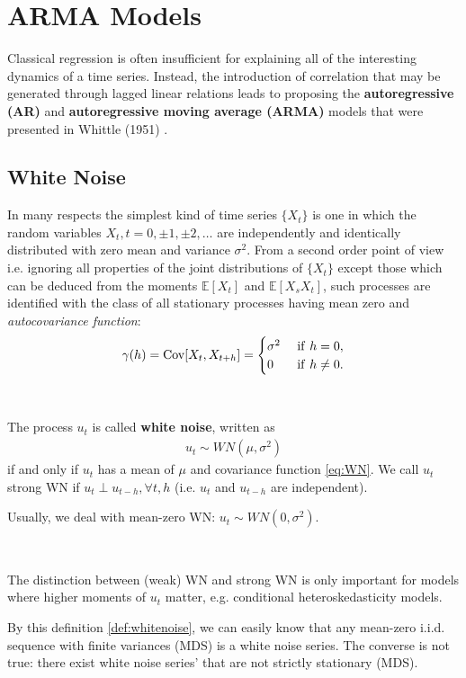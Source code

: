 \section{ARMA Models}\label{sec:ARMA}
Classical regression is often insufficient for explaining all of the interesting dynamics
of a time series.
Instead, the introduction of correlation that may be generated through lagged linear relations
leads to proposing the \textbf{autoregressive (AR)} and \textbf{autoregressive moving average (ARMA)} models
that were presented in Whittle (1951) \cite{Whittle1951}.


\subsection{White Noise}\label{sec:whitenoise}

In many respects the simplest kind of time series $\{X_t\}$ is one in which
the random variables $X_t,t=0,\pm1,\pm2,\ldots$ are independently and identically distributed with zero mean and variance $\sigma^2.$
From a second order point of view i.e. ignoring all properties of the joint distributions of $\{X_t\}$
except those which can be deduced from the moments $\mathbb{E}[X_t]$ and $\mathbb{E}[X_s X_t]$,
such processes are identified with the class of all stationary processes having mean zero and \textit{autocovariance function}:
\begin{gather}\label{eq:WN}
    \gamma(h)=\operatorname{Cov}[X_t, X_{t+h}]=\begin{cases}
                                \sigma^2 & \mathrm{~if~}h=0,\\
                                0 & \mathrm{~if~}h\neq 0.
                            \end{cases}
\end{gather}

\begin{definition}\label{def:whitenoise}
    \
    
    The process $u_t$ is called \textbf{white noise}, written as
    \begin{gather*}
        u_t \sim WN(\mu, \sigma^2) 
    \end{gather*}
    if and only if $u_t$ has a mean of $\mu$ and covariance function \ref{eq:WN}.
    We call $u_t$ strong WN if $u_t \perp u_{t-h}, \forall t,h$ (i.e. $u_t$ and $u_{t-h}$ are independent).
\end{definition}

Usually, we deal with mean-zero WN: $u_t \sim WN(0, \sigma^2).$
\begin{note}
    \

    The distinction between (weak) WN and strong WN is only important for models where higher moments of $u_t$ matter, e.g.
    conditional heteroskedasticity models.
\end{note}
By this definition \ref{def:whitenoise}, we can easily know that any mean-zero i.i.d. sequence with finite variances (MDS) is a
white noise series. The converse is not true: there exist white noise series' that are not strictly stationary (MDS).

